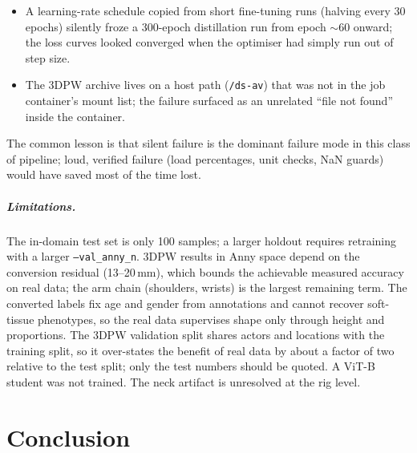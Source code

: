 \begin{itemize}
        ``reliable-joint'' metric that quietly excluded the affected joints;
        only comparing the two rest skeletons geometrically exposed it.
  \item A learning-rate schedule copied from short fine-tuning runs (halving
        every 30 epochs) silently froze a 300-epoch distillation run from
        epoch $\sim$60 onward; the loss curves looked converged when the
        optimiser had simply run out of step size.
  \item The 3DPW archive lives on a host path (\texttt{/ds-av}) that was not
        in the job container's mount list; the failure surfaced as an
        unrelated ``file not found'' inside the container.
\end{itemize}
The common lesson is that silent failure is the dominant failure mode in this
class of pipeline; loud, verified failure (load percentages, unit checks, NaN
guards) would have saved most of the time lost.

\paragraph{Limitations.} The in-domain test set is only 100 samples; a
larger holdout requires retraining with a larger \texttt{--val\_anny\_n}. 3DPW
results in Anny space depend on the conversion residual (13--20\,mm), which
bounds the achievable measured accuracy on real data; the arm chain
(shoulders, wrists) is the largest remaining term. The converted labels fix
age and gender from annotations and cannot recover soft-tissue phenotypes,
so the real data supervises shape only through height and proportions. The
3DPW validation split shares actors and locations with the training split,
so it over-states the benefit of real data by about a factor of two relative
to the test split; only the test numbers should be quoted. A ViT-B student
was not trained. The neck artifact is unresolved at the rig level.

\chapter{Conclusion}
\label{ch:conclusion}

